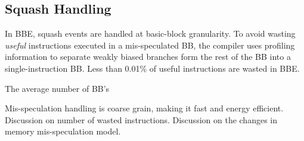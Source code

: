 \subsection{Squash Handling}
\label{sec:speculation}

In BBE, squash events are handled at basic-block granularity. To avoid wasting
{\it{useful}} instructions executed in a mis-speculated BB, the compiler uses
profiling information to separate weakly biased branches form the rest of the BB
into a single-instruction BB. Less than 0.01\% of useful instructions are wasted
in BBE.

The average number of BB's 



Mis-speculation handling is coarse grain, making it fast and energy efficient.
Discussion on number of wasted instructions.
Discussion on the changes in memory mis-speculation model.

%
%
